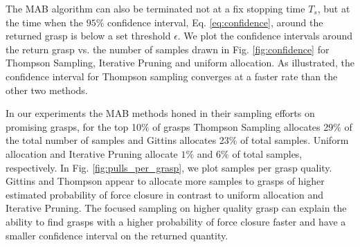 \documentclass[10pt, conference]{ieeeconf}      %
\begin{document}
 The MAB algorithm can also be terminated not at a fix stopping time $T_s$, but at the time when the $95\%$ confidence interval, Eq. \ref{eq:confidence}, around the returned grasp is below a set threshold $\epsilon$. We plot the confidence intervals around the return grasp vs. the number of samples drawn in Fig. \ref{fig:confidence} for Thompson Sampling, Iterative Pruning\cite{kehoe2012toward} and uniform allocation.  As illustrated, the confidence interval for Thompson sampling converges at a faster rate than the other two methods. 

 In our experiments the MAB methods honed in their sampling efforts on promising grasps, for the top 10$\%$ of grasps Thompson Sampling allocates 29$\%$ of the total number of samples and Gittins allocates 23$\%$ of total samples. Uniform allocation and Iterative Pruning allocate $1\%$  and $6\%$ of total samples, respectively. In Fig. \ref{fig:pulls_per_grasp}, we plot samples per grasp quality. Gittins and Thompson appear to allocate  more samples to grasps of higher estimated probability of force closure in contrast to uniform allocation and Iterative Pruning. The focused sampling on higher quality grasp can explain the ability to find grasps with a higher probability of force closure  faster and have a smaller confidence interval on the returned quantity. 
 
 
\end{document}
